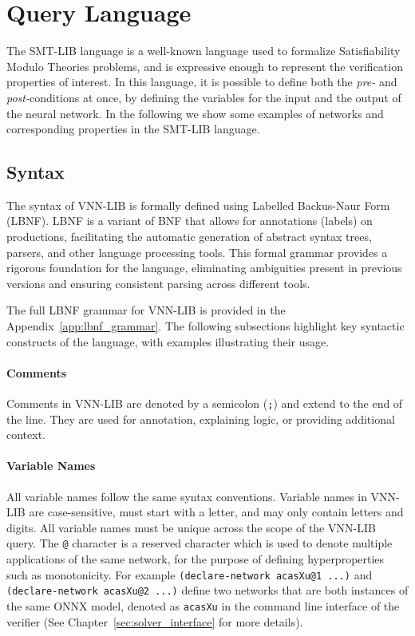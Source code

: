 \chapter{Query Language}\label{sec:specification_language}

The SMT-LIB language is a well-known language used to formalize 
Satisfiability Modulo Theories problems, and is expressive enough to
represent the verification properties of interest. In this language, 
it is possible to define both the \textit{pre-} and 
\textit{post-}conditions at once, by defining the variables for the
input and the output of the neural network. In the following we
show some examples of networks and corresponding properties in the
SMT-LIB language.

\section{Syntax}
\label{sec:syntax}

The syntax of VNN-LIB is formally defined using Labelled Backus-Naur Form (LBNF)\cite{8}. LBNF is a variant of BNF that allows for 
annotations (labels) on productions, facilitating the automatic generation of abstract syntax trees, parsers, and other language processing tools. 
This formal grammar provides a rigorous foundation for the language, eliminating ambiguities present in previous versions and ensuring consistent 
parsing across different tools.

The full LBNF grammar for VNN-LIB is provided in the Appendix~\ref{app:lbnf_grammar}. The following subsections highlight key syntactic constructs of the language,
with examples illustrating their usage.

\subsubsection*{Comments}
Comments in VNN-LIB are denoted by a semicolon (\texttt{;}) and extend to the end of the line. They are used for annotation, explaining logic, or providing additional context.

\subsubsection*{Variable Names}
All variable names follow the same syntax conventions. Variable names in VNN-LIB are case-sensitive, must start with a letter, and may only contain letters and digits. All variable names must
be unique across the scope of the VNN-LIB query. The \texttt{@} character is a reserved character which is used to denote multiple applications of the same network, for the purpose of defining 
hyperproperties such as monotonicity. For example \texttt{(declare-network acasXu@1 ...)} and \texttt{(declare-network acasXu@2 ...)} define two networks that are both instances of the same ONNX model, 
denoted as \texttt{acasXu} in the command line interface of the verifier (See Chapter~\ref{sec:solver_interface} for more details).

